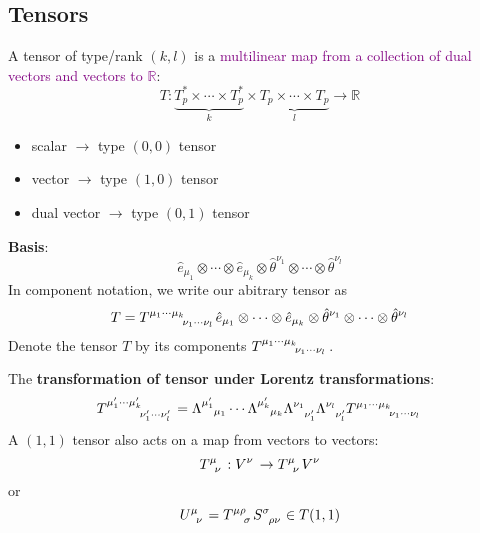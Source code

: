 \subsection{Tensors}
A tensor of type/rank $(k,l)$ is a \textcolor{purple}{multilinear map from a collection of dual vectors and vectors to $\mathbb{R}$}:
\begin{equation*}
    T:\underbrace{T_p^*\times\cdots \times T_p^*}_{k}\times \underbrace{T_p\times\cdots\times T_p}_{l} \to \mathbb{R}
\end{equation*}
\begin{itemize}
    \item scalar $\longrightarrow$ type $(0,0)$ tensor
    \item vector $\longrightarrow$ type $(1,0)$ tensor
    \item dual vector $\longrightarrow$ type $(0,1)$ tensor
\end{itemize}
\textbf{Basis}:
\begin{equation*}
    \hat{e}_{\mu_1}\otimes\cdots\otimes\hat{e}_{\mu_k}\otimes\hat{\theta}^{\nu_1}\otimes\cdots\otimes\hat{\theta}^{\nu_l}
\end{equation*}
In component notation, we write our abitrary tensor as
\begin{equation*}
    T=\tensor{T}{^{\mu_1\cdots\mu_k}_{\nu_1\cdots\nu_l}}\hat{e}_{\mu_1}\otimes\cdots\otimes\hat{e}_{\mu_k}\otimes\hat{\theta}^{\nu_1}\otimes\cdots\otimes\hat{\theta}^{\nu_l}
\end{equation*}
Denote the tensor $T$ by its components $\tensor{T}{^{\mu_1\cdots\mu_k}_{\nu_1\cdots\nu_l}}$.

The \textbf{transformation of tensor under Lorentz transformations}:
\begin{equation*}
    \tensor{T}{^{{\mu_1'}\cdots{\mu_k'}}_{{\nu_1'}\cdots{\nu_l'}}}=\tensor{\Lambda}{^{\mu_1'}_{\mu_1}}\cdots\tensor{\Lambda}{^{\mu_k'}_{\mu_k}}\tensor{\Lambda}{^{\nu_1}_{\nu_1'}}\tensor{\Lambda}{^{\nu_l}_{\nu_l'}}\tensor{T}{^{\mu_1\cdots\mu_k}_{\nu_1\cdots\nu_l}}
\end{equation*}
A $(1,1)$ tensor also acts on a map from vectors to vectors:
\begin{equation*}
    \tensor{T}{^\mu_\nu}:V^\nu\,\to \tensor{T}{^\mu_\nu}V^\nu
\end{equation*}
or
\begin{equation*}
    \tensor{U}{^\mu_\nu}=\tensor{T}{^{\mu\rho}_\sigma}\tensor{S}{^\sigma_{\rho\nu}}\in T(1,1)
\end{equation*}

